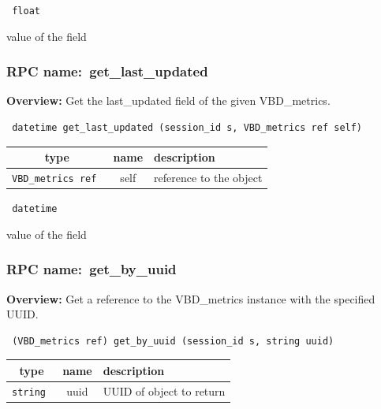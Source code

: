 \vspace{0.3cm}

{\tt 
float
}


value of the field
\vspace{0.3cm}
\vspace{0.3cm}
\vspace{0.3cm}
\subsubsection{RPC name:~get\_last\_updated}

{\bf Overview:} 
Get the last\_updated field of the given VBD\_metrics.

\begin{verbatim} datetime get_last_updated (session_id s, VBD_metrics ref self)\end{verbatim}



 
\vspace{0.3cm}
\begin{tabular}{|c|c|p{7cm}|}
 \hline
{\bf type} & {\bf name} & {\bf description} \\ \hline
{\tt VBD\_metrics ref } & self & reference to the object \\ \hline 

\end{tabular}

\vspace{0.3cm}

{\tt 
datetime
}


value of the field
\vspace{0.3cm}
\vspace{0.3cm}
\vspace{0.3cm}
\subsubsection{RPC name:~get\_by\_uuid}

{\bf Overview:} 
Get a reference to the VBD\_metrics instance with the specified UUID.

\begin{verbatim} (VBD_metrics ref) get_by_uuid (session_id s, string uuid)\end{verbatim}



 
\vspace{0.3cm}
\begin{tabular}{|c|c|p{7cm}|}
 \hline
{\bf type} & {\bf name} & {\bf description} \\ \hline
{\tt string } & uuid & UUID of object to return \\ \hline 

\end{tabular}

